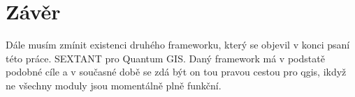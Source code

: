 \chapter*{Závěr}

Dále musím zmínit existenci druhého frameworku, který se objevil v konci psaní této práce. SEXTANT pro Quantum GIS. Daný framework má v podstatě podobné cíle a v současné době se zdá být on tou pravou cestou pro qgis, ikdyž ne všechny moduly jsou momentálně plně funkční. 